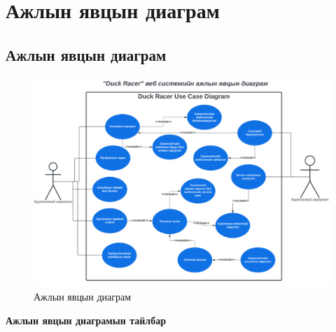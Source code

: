 \pagebreak
\section{Ажлын явцын диаграм}

\subsection{Ажлын явцын диаграм}
\begin{figure}[h]
	\centering
	\includegraphics[width=15cm]{images/usecase.png}
	\caption{Ажлын явцын диаграм}
	\label{fig:usecase}
\end{figure}

\textbf{Ажлын явцын диаграмын тайлбар}


